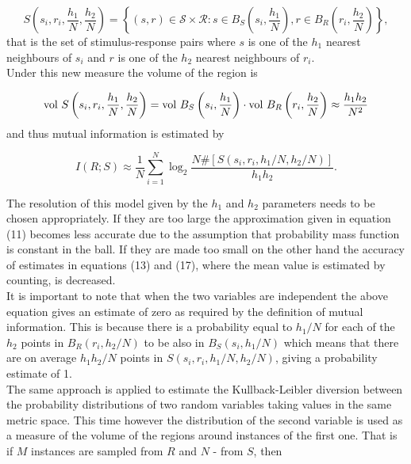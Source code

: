 \documentclass[12pt]{extarticle}
\begin{document}
\begin{equation}
S\left( s_i, r_i, \frac{h_1}{N}, \frac{h_2}{N} \right) = \left\{ (s,r) \in \mathcal{S} \times \mathcal{R} : s \in B_S\left(s_i, \frac{h_1}{N}\right), r \in B_R\left(r_i, \frac{h_2}{N}\right)\right\},
\end{equation}
that is the set of stimulus-response pairs where $s$ is one of the $h_1$ nearest neighbours of $s_i$ and $r$ is one of the $h_2$ nearest neighbours of $r_i$.\\

\noindent
Under this new measure the volume of the region is

\begin{equation}
\textnormal{vol } S\left( s_i, r_i, \frac{h_1}{N}, \frac{h_2}{N} \right) = \textnormal{vol } B_S\left(s_i, \frac{h_1}{N}\right) \cdot \textnormal{vol }B_R\left(r_i, \frac{h_2}{N}\right) \approx \frac{h_1h_2}{N^2}
\end{equation}
and thus mutual information is estimated by

\begin{equation}
I(R;S) \approx \frac{1}{N} \sum_{i=1}^{N} \log_2 \frac{N\#[S(s_i,r_i, h_1/N,h_2/N)]}{h_1h_2}.
\end{equation}

\noindent
The resolution of this model given by the $h_1$ and $h_2$ parameters needs to be chosen appropriately. If they are too large the approximation given in equation (11) becomes less accurate due to the assumption that probability mass function is constant in the ball. If they are made too small on the other hand the accuracy of estimates in equations (13) and (17), where the mean value is estimated by counting, is decreased.\\

\noindent
It is important to note that when the two variables are independent the above equation gives an estimate of zero as required by the definition of mutual information. This is because there is a probability equal to $h_1/N$ for each of the $h_2$ points in $B_R(r_i, h_2/N)$ to be also in $B_S(s_i, h_1/N)$ which means that there are on average $h_1h_2/N$ points in $S(s_i,r_i,h_1/N,h_2/N)$, giving a probability estimate of 1.\\

\noindent
The same approach is applied to estimate the Kullback-Leibler diversion between the probability distributions of two random variables taking values in the same metric space. This time however the distribution of the second variable is used as a measure of the volume of the regions around instances of the first one. That is if $M$ instances are sampled from $R$ and $N$ - from $S$, then
\end{document}
